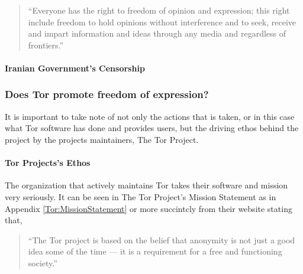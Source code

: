 \documentclass[11pt]{article}
\begin{document}
\begin{multicols}{2}
\begin{quotation} 
  ``Everyone has the right to freedom of opinion and expression;
  this right include freedom to hold opinions without interference and to seek,
  receive and impart information and ideas through any media and regardless of
  frontiers.''\cite{UniversalDeclerationOfHumanRights}
\end{quotation}



\paragraph{Iranian Government's Censorship}




\subsubsection{Does Tor promote freedom of expression?}

It is important to take note of not only the actions that is taken, or in this
case what Tor software has done and provides users, but the driving ethos behind
the project by the projects maintainers, The Tor Project.

\paragraph{Tor Projects's Ethos}

The organization that actively maintains Tor takes their software and mission
very seriously. It can be seen in The Tor Project's Mission Statement as in
Appendix \ref{Tor:MissionStatement} or more succintcly from their website
stating that,


\begin{quotation}  
  ``The Tor project is based on the belief that anonymity is not just a good
  idea some of the time — it is a requirement for a free and functioning
  society.''\cite{Tor:Users}
\end{quotation}



\end{multicols}
\end{document}
